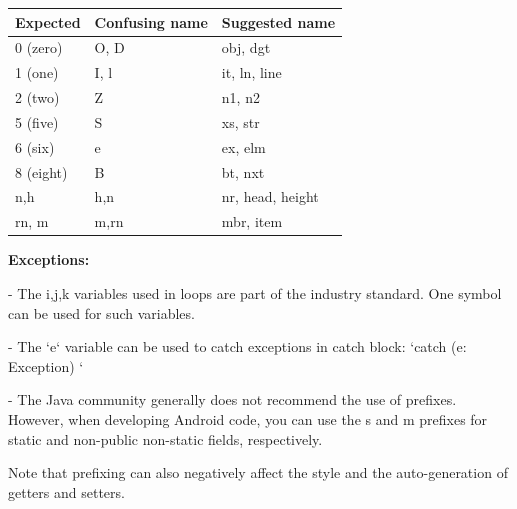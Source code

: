 \begin{center}

\begin{tabular}{ |p{5.0cm}|p{5.0cm}|p{5.0cm}| }

\hline

Expected&Confusing name&Suggested name\\

\hline

 0 (zero)      & O, D                     & obj, dgt         \\

 1 (one)       & I, l                     & it, ln, line     \\

 2 (two)       & Z                        & n1, n2           \\

 5 (five)      & S                        & xs, str          \\

 6 (six)       & e                        & ex, elm          \\

 8 (eight)     & B                        & bt, nxt          \\

 n,h           & h,n                      & nr, head, height \\

 rn, m         & m,rn                     & mbr, item        \\

\hline

\end{tabular}

\end{center}

\textbf{Exceptions:}

- The i,j,k variables used in loops are part of the industry standard. One symbol can be used for such variables.

- The `e` variable can be used to catch exceptions in catch block: `catch (e: Exception) {}`

- The Java community generally does not recommend the use of prefixes. However, when developing Android code, you can use the s and m prefixes for static and non-public non-static fields, respectively.

Note that prefixing can also negatively affect the style and the auto-generation of getters and setters.



